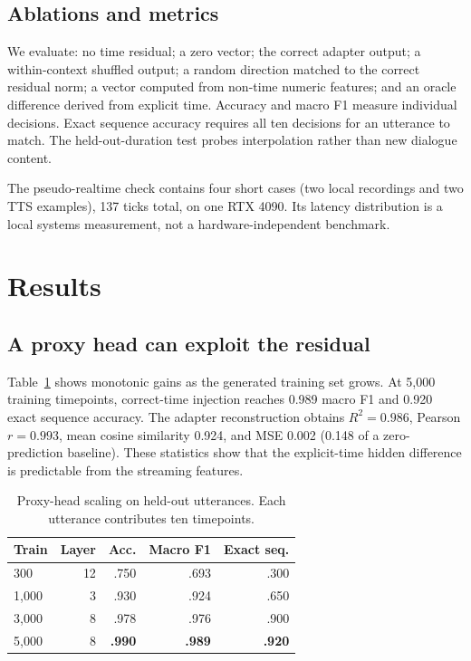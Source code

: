 \documentclass[10pt,twocolumn]{article}
\begin{document}
\subsection{Ablations and metrics}

We evaluate: no time residual; a zero vector; the correct adapter output; a within-context shuffled output; a random direction matched to the correct residual norm; a vector computed from non-time numeric features; and an oracle difference derived from explicit time. Accuracy and macro F1 measure individual decisions. Exact sequence accuracy requires all ten decisions for an utterance to match. The held-out-duration test probes interpolation rather than new dialogue content.

The pseudo-realtime check contains four short cases (two local recordings and two TTS examples), 137 ticks total, on one RTX 4090. Its latency distribution is a local systems measurement, not a hardware-independent benchmark.

\section{Results}

\subsection{A proxy head can exploit the residual}

Table~\ref{tab:scale} shows monotonic gains as the generated training set grows. At 5,000 training timepoints, correct-time injection reaches 0.989 macro F1 and 0.920 exact sequence accuracy. The adapter reconstruction obtains $R^2=0.986$, Pearson $r=0.993$, mean cosine similarity 0.924, and MSE 0.002 (0.148 of a zero-prediction baseline). These statistics show that the explicit-time hidden difference is predictable from the streaming features.

\begin{table}[t]
\centering
\caption{Proxy-head scaling on held-out utterances. Each utterance contributes ten timepoints.}
\label{tab:scale}
\small
\begin{tabular}{lrrrr}
\toprule
Train & Layer & Acc. & Macro F1 & Exact seq.\\
\midrule
300   & 12 & .750 & .693 & .300\\
1,000 & 3  & .930 & .924 & .650\\
3,000 & 8  & .978 & .976 & .900\\
5,000 & 8  & \textbf{.990} & \textbf{.989} & \textbf{.920}\\
\bottomrule
\end{tabular}
\end{table}
\end{document}
